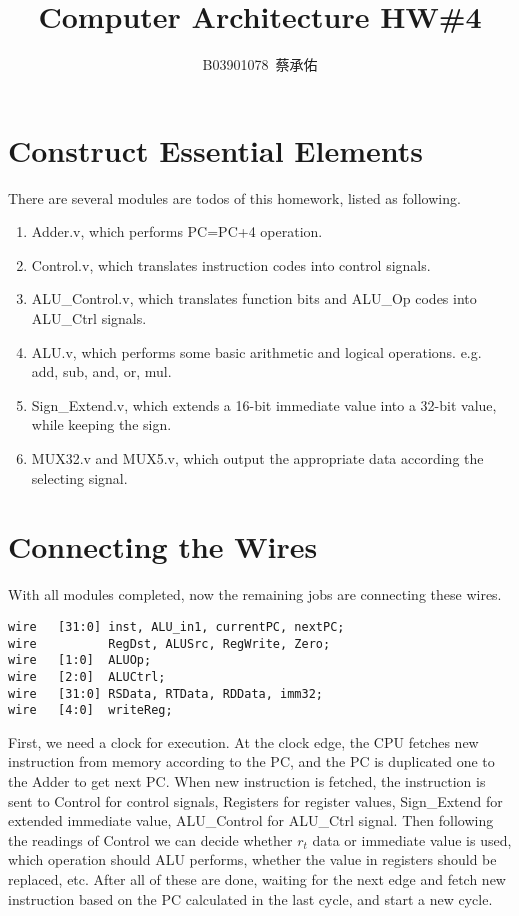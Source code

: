 \documentclass{article}
\title{Computer Architecture HW\#4}
\author{B03901078\, 蔡承佑}
\begin{document}
\newcommand{\red}[1]{\textcolor{red}{#1}}
\newcommand{\br}[1]{\left( #1 \right)}
\newcommand{\sbr}[1]{\left[ #1 \right]}
\maketitle
\section{Construct Essential Elements}
There are several modules are todos of this homework, listed as following.
\begin{enumerate}
\item {\cs Adder.v}, which performs {\cs PC=PC+4} operation.
\item {\cs Control.v}, which translates instruction codes into control signals.
\item {\cs ALU\_Control.v}, which translates function bits and {\cs ALU\_Op} codes into {\cs ALU\_Ctrl} signals.
\item {\cs ALU.v}, which performs some basic arithmetic and logical operations. e.g. add, sub, and, or, mul.
\item {\cs Sign\_Extend.v}, which extends a 16-bit immediate value into a 32-bit value, while keeping the sign.
\item {\cs MUX32.v} and {\cs MUX5.v}, which output the appropriate data according the selecting signal.
\end{enumerate}
\section{Connecting the Wires}
With all modules completed, now the remaining jobs are connecting these wires.

{\cs\begin{framed}
\begin{lstlisting}
wire   [31:0] inst, ALU_in1, currentPC, nextPC;
wire          RegDst, ALUSrc, RegWrite, Zero;
wire   [1:0]  ALUOp;
wire   [2:0]  ALUCtrl;
wire   [31:0] RSData, RTData, RDData, imm32;
wire   [4:0]  writeReg;
\end{lstlisting}
\end{framed}}

First, we need a clock for execution. At the clock edge, the CPU fetches new instruction from memory according to the PC, 
and the PC is duplicated one to the Adder to get next PC. When new instruction is fetched, the instruction is sent to {\cs Control}
for control signals, {\cs Registers} for register values, {\cs Sign\_Extend} for extended immediate value, {\cs ALU\_Control} for 
ALU\_Ctrl signal. Then following the readings of {\cs Control} we can decide whether $r_t$ data or immediate value is used, which 
operation should ALU performs, whether the value in registers should be replaced, etc. After all of these are done, waiting for the
next edge and fetch new instruction based on the PC calculated in the last cycle, and start a new cycle.
\end{document}

